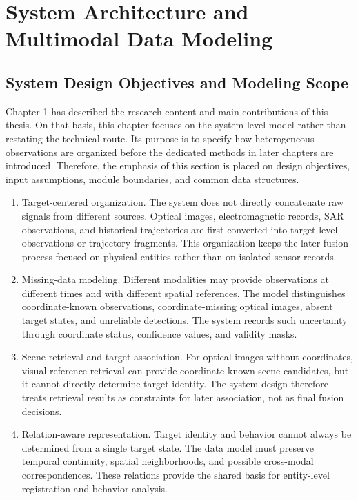 \chapter{System Architecture and Multimodal Data Modeling}

\section{System Design Objectives and Modeling Scope}
Chapter 1 has described the research content and main contributions of this thesis. On that basis, this chapter focuses on the system-level model rather than restating the technical route. Its purpose is to specify how heterogeneous observations are organized before the dedicated methods in later chapters are introduced. Therefore, the emphasis of this section is placed on design objectives, input assumptions, module boundaries, and common data structures.

\begin{enumerate}
  \item Target-centered organization. The system does not directly concatenate raw signals from different sources. Optical images, electromagnetic records, SAR observations, and historical trajectories are first converted into target-level observations or trajectory fragments. This organization keeps the later fusion process focused on physical entities rather than on isolated sensor records.

  \item Missing-data modeling. Different modalities may provide observations at different times and with different spatial references. The model distinguishes coordinate-known observations, coordinate-missing optical images, absent target states, and unreliable detections. The system records such uncertainty through coordinate status, confidence values, and validity masks.

  \item Scene retrieval and target association. For optical images without coordinates, visual reference retrieval can provide coordinate-known scene candidates, but it cannot directly determine target identity. The system design therefore treats retrieval results as constraints for later association, not as final fusion decisions.

  \item Relation-aware representation. Target identity and behavior cannot always be determined from a single target state. The data model must preserve temporal continuity, spatial neighborhoods, and possible cross-modal correspondences. These relations provide the shared basis for entity-level registration and behavior analysis.
\end{enumerate}


